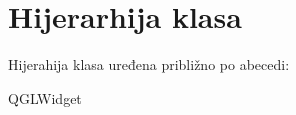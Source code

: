 \section{Hijerarhija klasa}
Hijerahija klasa uređena približno po abecedi\+:\begin{DoxyCompactList}
\item {}
\item {}
\item Q\+G\+L\+Widget\begin{DoxyCompactList}
\item {}
\end{DoxyCompactList}
\end{DoxyCompactList}
